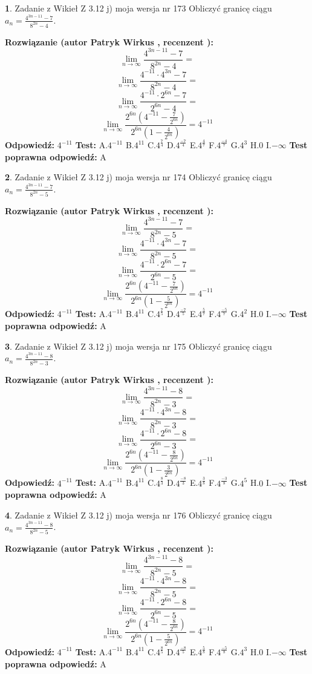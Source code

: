 \documentclass[12pt, a4paper]{article}
\theoremstyle{definition} %
\newtheorem{zad}{}
\newcommand{\zadStart}[1]{\begin{zad}#1\newline}
\newcommand{\zadStop}{\end{zad}}
\newcommand{\rozwStart}[2]{\noindent \textbf{Rozwiązanie (autor #1 , recenzent #2): }\newline}
\newcommand{\rozwStop}{\newline}
\newcommand{\odpStart}{\noindent \textbf{Odpowiedź:}\newline}
\newcommand{\odpStop}{\newline}
\newcommand{\testStart}{\noindent \textbf{Test:}\newline}
\newcommand{\testStop}{\newline}
\newcommand{\kluczStart}{\noindent \textbf{Test poprawna odpowiedź:}\newline}
\newcommand{\kluczStop}{\newline}
\begin{document}
\zadStart{Zadanie z Wikieł Z 3.12 j) moja wersja nr 173}
Obliczyć granicę ciągu $a_{n}=\frac{4^{3n-11}-7}{8^{2n}-4}$.
\zadStop
\rozwStart{Patryk Wirkus}{}
$$\lim\limits_{n\to\infty}\frac{4^{3n-11}-7}{8^{2n}-4}=$$
$$\lim\limits_{n\to\infty}\frac{4^{-11} \cdot 4^{3n}-7}{8^{2n}-4}=$$
$$\lim\limits_{n\to\infty}\frac{4^{-11} \cdot 2^{6n}-7}{2^{6n}-4}=$$
$$\lim\limits_{n\to\infty}\frac{2^{6n}(4^{-11} - \frac{7}{2^{6n}})}{2^{6n}(1-\frac{4}{2^{6n}})}= 4^{-11}$$
\rozwStop
\odpStart
$4^{-11}$
\odpStop
\testStart
A.$4^{-11}$
B.$4^{11}$
C.$4^{\frac{7}{4}}$
D.$4^{\frac{-7}{4}}$
E.$4^{\frac{4}{7}}$
F.$4^{\frac{-4}{7}}$
G.$4^{3}$
H.$0$
I.$-\infty$
\testStop
\kluczStart
A
\kluczStop



\zadStart{Zadanie z Wikieł Z 3.12 j) moja wersja nr 174}
Obliczyć granicę ciągu $a_{n}=\frac{4^{3n-11}-7}{8^{2n}-5}$.
\zadStop
\rozwStart{Patryk Wirkus}{}
$$\lim\limits_{n\to\infty}\frac{4^{3n-11}-7}{8^{2n}-5}=$$
$$\lim\limits_{n\to\infty}\frac{4^{-11} \cdot 4^{3n}-7}{8^{2n}-5}=$$
$$\lim\limits_{n\to\infty}\frac{4^{-11} \cdot 2^{6n}-7}{2^{6n}-5}=$$
$$\lim\limits_{n\to\infty}\frac{2^{6n}(4^{-11} - \frac{7}{2^{6n}})}{2^{6n}(1-\frac{5}{2^{6n}})}= 4^{-11}$$
\rozwStop
\odpStart
$4^{-11}$
\odpStop
\testStart
A.$4^{-11}$
B.$4^{11}$
C.$4^{\frac{7}{5}}$
D.$4^{\frac{-7}{5}}$
E.$4^{\frac{5}{7}}$
F.$4^{\frac{-5}{7}}$
G.$4^{2}$
H.$0$
I.$-\infty$
\testStop
\kluczStart
A
\kluczStop



\zadStart{Zadanie z Wikieł Z 3.12 j) moja wersja nr 175}
Obliczyć granicę ciągu $a_{n}=\frac{4^{3n-11}-8}{8^{2n}-3}$.
\zadStop
\rozwStart{Patryk Wirkus}{}
$$\lim\limits_{n\to\infty}\frac{4^{3n-11}-8}{8^{2n}-3}=$$
$$\lim\limits_{n\to\infty}\frac{4^{-11} \cdot 4^{3n}-8}{8^{2n}-3}=$$
$$\lim\limits_{n\to\infty}\frac{4^{-11} \cdot 2^{6n}-8}{2^{6n}-3}=$$
$$\lim\limits_{n\to\infty}\frac{2^{6n}(4^{-11} - \frac{8}{2^{6n}})}{2^{6n}(1-\frac{3}{2^{6n}})}= 4^{-11}$$
\rozwStop
\odpStart
$4^{-11}$
\odpStop
\testStart
A.$4^{-11}$
B.$4^{11}$
C.$4^{\frac{8}{3}}$
D.$4^{\frac{-8}{3}}$
E.$4^{\frac{3}{8}}$
F.$4^{\frac{-3}{8}}$
G.$4^{5}$
H.$0$
I.$-\infty$
\testStop
\kluczStart
A
\kluczStop



\zadStart{Zadanie z Wikieł Z 3.12 j) moja wersja nr 176}
Obliczyć granicę ciągu $a_{n}=\frac{4^{3n-11}-8}{8^{2n}-5}$.
\zadStop
\rozwStart{Patryk Wirkus}{}
$$\lim\limits_{n\to\infty}\frac{4^{3n-11}-8}{8^{2n}-5}=$$
$$\lim\limits_{n\to\infty}\frac{4^{-11} \cdot 4^{3n}-8}{8^{2n}-5}=$$
$$\lim\limits_{n\to\infty}\frac{4^{-11} \cdot 2^{6n}-8}{2^{6n}-5}=$$
$$\lim\limits_{n\to\infty}\frac{2^{6n}(4^{-11} - \frac{8}{2^{6n}})}{2^{6n}(1-\frac{5}{2^{6n}})}= 4^{-11}$$
\rozwStop
\odpStart
$4^{-11}$
\odpStop
\testStart
A.$4^{-11}$
B.$4^{11}$
C.$4^{\frac{8}{5}}$
D.$4^{\frac{-8}{5}}$
E.$4^{\frac{5}{8}}$
F.$4^{\frac{-5}{8}}$
G.$4^{3}$
H.$0$
I.$-\infty$
\testStop
\kluczStart
A
\kluczStop
\end{document}
